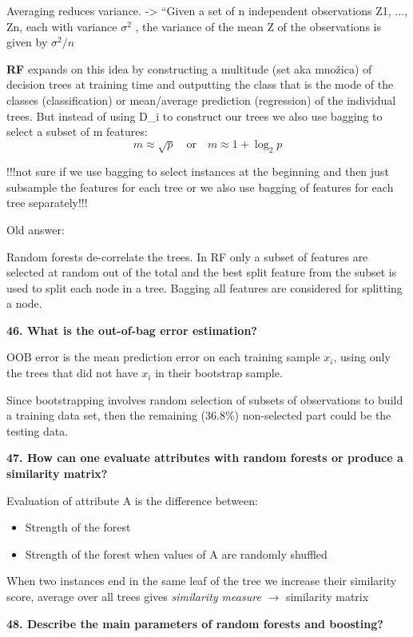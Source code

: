 Averaging reduces variance. -\textgreater{} ``Given a set of n
independent observations Z1, ..., Zn, each with variance $\sigma^2$ , the
variance of the mean Z of the observations is given by
$\sigma^{2}/n$

\textbf{RF} expands on this idea by constructing a multitude (set aka
množica) of decision trees at training time and outputting the class
that is the mode of the classes (classification) or mean/average
prediction (regression) of the individual trees. But instead of using
D\_i to construct our trees we also use bagging to select a subset of m
features:
\[ m \approx \sqrt{p} \quad \text{or} \quad m \approx 1 + \log_2 p \]

!!!not sure if we use bagging to select instances at the beginning and
then just subsample the features for each tree or we also use bagging of
features for each tree separately!!!

Old answer:

Random forests de-correlate the trees. In RF only a subset of features
are selected at random out of the total and the best split feature from
the subset is used to split each node in a tree. Bagging all features
are considered for splitting a node.

\textbf{46. What is the out-of-bag error estimation?}

OOB error is the mean prediction error on each training sample $x_i$, using
only the trees that did not have $x_i$ in their bootstrap sample.

Since bootstrapping involves random selection of subsets of observations
to build a training data set, then the remaining (36.8\%) non-selected
part could be the testing data.

\textbf{47. How can one evaluate attributes with random forests or
produce a similarity matrix?}

Evaluation of attribute A is the difference between:

\begin{itemize}
\item Strength of the forest
\item Strength of the forest when values of A are randomly shuffled
\end{itemize}

When two instances end in the same leaf of the tree we increase their
similarity score, average over all trees gives \textit{similarity measure}
$\rightarrow$ similarity matrix

\textbf{48. Describe the main parameters of random forests and
boosting?}

